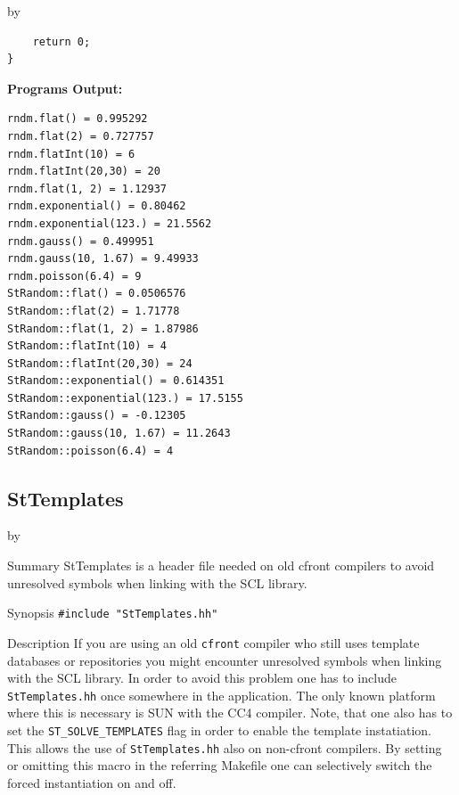 \documentclass[twoside]{article}
\newcommand{\comp}[1]{\texttt{#1}}%
\newcommand{\entrylabel}[1]{\mbox{\textbf{{#1}}}\hfil}%
\newenvironment{entry}
{\begin{list}{}%
    {\renewcommand{\makelabel}{\entrylabel}%
     \setlength{\labelwidth}{90pt}%
     \setlength{\leftmargin}{\labelwidth}
     \advance\leftmargin by \labelsep%
      }%
    }%
  {\end{list}}
\newcommand{\Entrylabel}[1]%
{\raisebox{0pt}[1ex][0pt]{\makebox[\labelwidth][l]%
    {\parbox[t]{\labelwidth}{\hspace{0pt}\textbf{{#1}}}}}}
\newenvironment{Entry}%
{\renewcommand{\entrylabel}{\Entrylabel}\begin{entry}}%
  {\end{entry}}
\begin{document}
\begin{Entry}
{\begin{verbatim}
    return 0;
}
\end{verbatim}
}%
{\bf Programs Output:}
{\footnotesize
\begin{verbatim}
rndm.flat() = 0.995292
rndm.flat(2) = 0.727757
rndm.flatInt(10) = 6
rndm.flatInt(20,30) = 20
rndm.flat(1, 2) = 1.12937
rndm.exponential() = 0.80462
rndm.exponential(123.) = 21.5562
rndm.gauss() = 0.499951
rndm.gauss(10, 1.67) = 9.49933
rndm.poisson(6.4) = 9
StRandom::flat() = 0.0506576
StRandom::flat(2) = 1.71778
StRandom::flat(1, 2) = 1.87986
StRandom::flatInt(10) = 4
StRandom::flatInt(20,30) = 24
StRandom::exponential() = 0.614351
StRandom::exponential(123.) = 17.5155
StRandom::gauss() = -0.12305
StRandom::gauss(10, 1.67) = 11.2643
StRandom::poisson(6.4) = 4
\end{verbatim}
} %
\end{Entry}

%
%
\subsection{StTemplates }
\begin{Entry}
\item[Summary]
    StTemplates is a header file needed on old cfront compilers to
    avoid unresolved symbols when linking with the SCL library.
    
\item[Synopsis]
    \verb+#include "StTemplates.hh"+
    
  
\item[Description]   
    If you are using an old \texttt{cfront} compiler 
    who still uses template databases
    or repositories you might encounter unresolved symbols when linking with the SCL library.
    In order to avoid this problem one has to include \comp{StTemplates.hh}
    once somewhere in the application. The only known platform where this is necessary is
    SUN with the CC4 compiler. Note, that one also has to set the \comp{ST\_SOLVE\_TEMPLATES}
    flag in order to enable the template instatiation. This allows the use of \comp{StTemplates.hh}
    also on non-cfront compilers. By setting or omitting this macro in the referring Makefile
    one can selectively switch the forced instantiation on and off.

\end{Entry}
\clearpage
\end{document}
